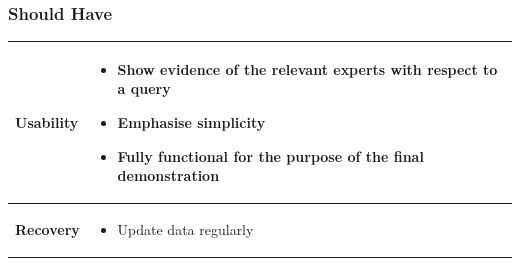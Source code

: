 \subsubsection{Should Have}
\begin{tabular}{|l|p{8.5cm}|}
\hline \textbf{Usability} &
\begin{itemize}
 \item Show evidence of the relevant experts with respect to a query
 \item Emphasise simplicity
 \item Fully functional for the purpose of the final demonstration
\end{itemize} \\
\hline \textbf{Recovery} & 
\begin{itemize}
 \item Update data regularly
\end{itemize}  \\ \hline
\end{tabular}



